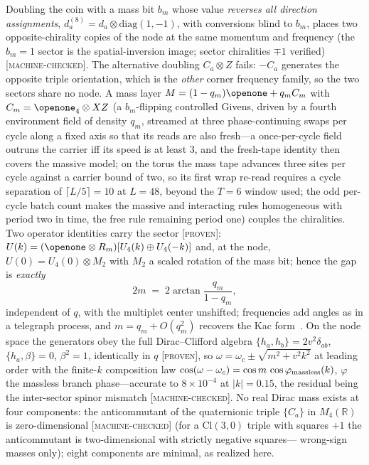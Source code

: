 \documentclass[aps,prd,twocolumn,superscriptaddress,nofootinbib,floatfix]{revtex4-2}
\newcommand{\evP}{\textnormal{\textsc{[proven]}}}
\newcommand{\evM}{\textnormal{\textsc{[machine-checked]}}}
\begin{document}
Doubling the coin with a mass bit $b_m$ whose value \emph{reverses all
direction assignments}, $d^{(8)}_a=d_a\otimes\mathrm{diag}(1,-1)$, with
conversions blind to $b_m$, places two opposite-chirality copies of the
node at the same momentum and frequency (the $b_m{=}1$ sector is the
spatial-inversion image; sector chiralities $\mp1$ verified) \evM{}. The
alternative doubling $C_a\otimes Z$ fails: $-C_a$ generates the
opposite triple orientation, which is the \emph{other} corner frequency
family, so the two sectors share no node. A mass layer
$M=(1-q_m)\openone+q_m C_m$ with $C_m=\openone_4\otimes XZ$ (a
$b_m$-flipping controlled Givens, driven by a fourth environment field of
density $q_m$, streamed at three phase-continuing swaps per cycle along a
fixed axis so that its reads are also fresh---a once-per-cycle field
outruns the carrier iff its speed is at least $3$, and the fresh-tape
identity then covers the massive model; on the torus the mass tape
advances three sites per cycle against a carrier bound of two, so its
first wrap re-read requires a cycle separation of $\lceil L/5\rceil=10$
at $L=48$, beyond the $T=6$ window used; the odd per-cycle batch count
makes the massive and interacting rules homogeneous with period two in
time, the free rule remaining period one) couples the chiralities. Two operator identities carry the
sector \evP{}: $U(k)=(\openone\otimes R_m)[U_4(k)\oplus U_4(-k)]$ and, at
the node, $U(0)=U_4(0)\otimes M_2$ with $M_2$ a scaled rotation of the mass
bit; hence the gap is \emph{exactly}
\begin{equation}
2m \;=\; 2\arctan\!\frac{q_m}{1-q_m},
\label{eq:massgap}
\end{equation}
independent of $q$, with the multiplet center unshifted; frequencies add
angles as in a telegraph process, and $m=q_m+O(q_m^2)$ recovers the Kac
form~\cite{Kac}. On the node space the generators obey the full Dirac--Clifford
algebra $\{h_a,h_b\}=2v^2\delta_{ab}$, $\{h_a,\beta\}=0$, $\beta^2=1$,
identically in $q$ \evP{}, so
$\omega=\omega_c\pm\sqrt{m^2+v^2k^2}$ at leading order with the
finite-$k$ composition law
$\cos(\omega-\omega_c)=\cos m\,\cos\varphi_{\rm massless}(k)$,
$\varphi$ the massless branch phase---accurate to $8\times10^{-4}$ at
$|k|=0.15$, the residual being the inter-sector spinor mismatch
\evM{}.
No real Dirac mass exists at four components: the anticommutant of the
quaternionic triple $\{C_a\}$ in $M_4(\mathbb R)$ is zero-dimensional
\evM{} (for a $\mathrm{Cl}(3,0)$ triple with squares $+1$ the
anticommutant is two-dimensional with strictly negative squares---
wrong-sign masses only); eight components are minimal, as realized here.
\end{document}
